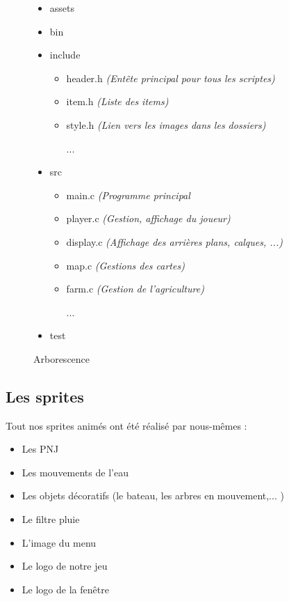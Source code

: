 \documentclass{article}
\begin{document}
\begin{figure}[h]  
    \begin{itemize}
        \item assets
        \item bin
        \item include
        \begin{itemize}
            \item header.h \textit{(Entête principal pour tous les scriptes)}
            \item item.h \textit{(Liste des items)}
            \item style.h \textit{(Lien vers les images dans les dossiers)}
            \item [...]
        \end{itemize}
        \item src
        \begin{itemize}
            \item main.c \textit{(Programme principal}
            \item player.c  \textit{(Gestion, affichage du joueur)}
            \item display.c \textit{(Affichage des arrières plans, calques, ...)}
            \item map.c \textit{(Gestions des cartes)}
            \item farm.c \textit{(Gestion de l'agriculture)}
            \item [...]
        \end{itemize}
        \item test
    \end{itemize}
    \centering
    \caption{Arborescence}
    \label{fig:arborescence}
\end{figure}

\newpage
\subsection{Les sprites}


Tout nos sprites animés ont été réalisé par nous-mêmes : 
\begin{itemize}
    \item Les PNJ
    \item Les mouvements de l'eau
    \item Les objets décoratifs (le bateau, les arbres en mouvement,... )
    \item Le filtre pluie
    \item L'image du menu
    \item Le logo de notre jeu
    \item Le logo de la fenêtre
\end{itemize}
\end{document}
